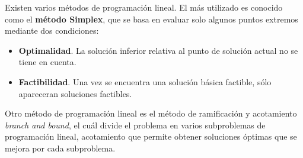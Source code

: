 Existen varios métodos de programación lineal. El más utilizado es conocido como el \textbf{método Simplex}, que se basa en evaluar solo algunos puntos extremos mediante dos condiciones:
\begin{itemize}
\item \textbf{Optimalidad}. La solución inferior relativa al punto de solución actual no se tiene en cuenta.
  \item \textbf{Factibilidad}. Una vez se encuentra una solución básica factible, sólo apareceran soluciones factibles.
\end{itemize}
Otro método de programación lineal es el método de ramificación y acotamiento \textit{branch and bound}, el cuál divide el problema en varios subproblemas de programación lineal, acotamiento que permite obtener soluciones óptimas que se mejora por cada subproblema.\\
